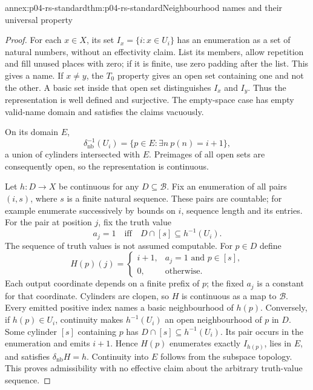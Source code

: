 \begin{annexitem}{annex:p04-rs-standard}{thm:p04-rs-standard}{Neighbourhood names and their universal property}
\begin{proof}
For each \(x\in X\), its set \(I_x=\{i:x\in U_i\}\) has an
enumeration as a set of natural numbers, without an effectivity
claim. List its members, allow repetition and fill unused places
with zero; if it is finite, use zero padding after the list.
This gives a name. If \(x\ne y\), the \(T_0\) property gives an
open set containing one and not the other. A basic set inside
that open set distinguishes \(I_x\) and \(I_y\). Thus the
representation is well defined and surjective. The empty-space
case has empty valid-name domain and satisfies the claims
vacuously.

On its domain \(E\),
\[
 \delta_{\mathrm{nb}}^{-1}(U_i)
 =\{p\in E:\exists n\ p(n)=i+1\},
\]
a union of cylinders intersected with \(E\).
Preimages of all open sets are consequently open, so the
representation is continuous.

Let \(h:D\to X\) be continuous for any \(D\subseteq\mathcal B\).
Fix an enumeration of all pairs \((i,s)\), where \(s\) is a finite
natural sequence. These pairs are countable; for example enumerate
successively by bounds on \(i\), sequence length and its entries.
For the pair at position \(j\), fix the truth value
\[
 a_j=1\quad\text{iff}\quad D\cap[s]\subseteq h^{-1}(U_i).
\]
The sequence of truth values is not assumed computable.
For \(p\in D\) define
\[
 H(p)(j)=
 \begin{cases}
 i+1,&a_j=1\text{ and }p\in[s],\\
 0,&\text{otherwise}.
 \end{cases}
\]
Each output coordinate depends on a finite prefix of \(p\);
the fixed \(a_j\) is a constant for that coordinate. Cylinders
are clopen, so \(H\) is continuous as a map to \(\mathcal B\).
Every emitted positive index names a basic neighbourhood of
\(h(p)\). Conversely, if \(h(p)\in U_i\), continuity makes
\(h^{-1}(U_i)\) an open neighbourhood of \(p\) in \(D\).
Some cylinder \([s]\) containing \(p\) has
\(D\cap[s]\subseteq h^{-1}(U_i)\).
Its pair occurs in the enumeration and emits \(i+1\).
Hence \(H(p)\) enumerates exactly \(I_{h(p)}\), lies in \(E\),
and satisfies \(\delta_{\mathrm{nb}}H=h\).
Continuity into \(E\) follows from the subspace topology.
This proves admissibility with no effective claim about the
arbitrary truth-value sequence.


\end{proof}
\end{annexitem}
